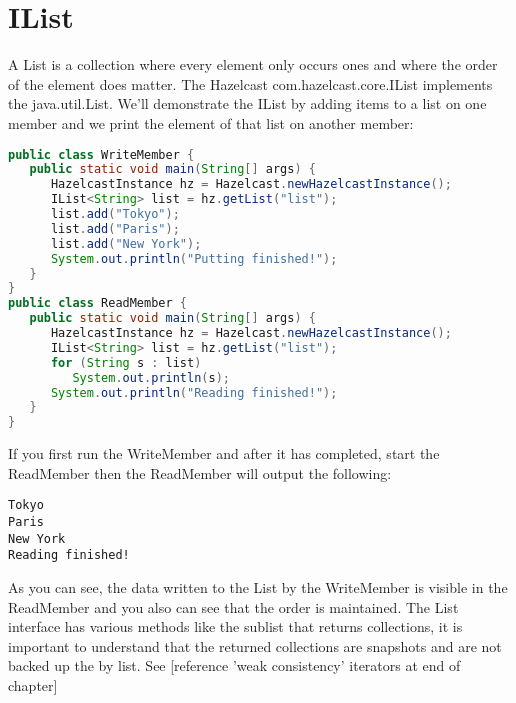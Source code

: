 \section{IList}
A List is a collection where every element only occurs ones and where the order of the element does matter. The Hazelcast com.hazelcast.core.IList implements the java.util.List. We'll demonstrate the IList by adding items to a list on one member and we print the element of that list on another member:
\begin{lstlisting}[language=java]
public class WriteMember {
   public static void main(String[] args) {
      HazelcastInstance hz = Hazelcast.newHazelcastInstance();
      IList<String> list = hz.getList("list");
      list.add("Tokyo");
      list.add("Paris");
      list.add("New York");
      System.out.println("Putting finished!");
   }
}
public class ReadMember {
   public static void main(String[] args) {
      HazelcastInstance hz = Hazelcast.newHazelcastInstance();
      IList<String> list = hz.getList("list");
      for (String s : list) 
         System.out.println(s);
      System.out.println("Reading finished!");
   }
}
\end{lstlisting}
If you first run the WriteMember and after it has completed, start the ReadMember then the ReadMember will output the following:
\begin{lstlisting}
Tokyo
Paris
New York
Reading finished!
\end{lstlisting}
As you can see, the data written to the List by the WriteMember is visible in the ReadMember and you also can see that the order is maintained. The List interface has various methods like the sublist that returns collections, it is important to understand that the returned collections are snapshots and are not backed up the by list. See [reference 'weak consistency' iterators at end of chapter]

